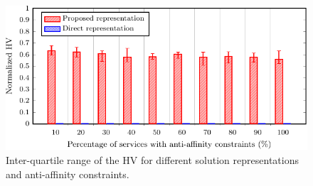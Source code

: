 \vspace{1em}
\noindent
{}

\begin{figure}[t!]
    \centering
    \includegraphics[width=\linewidth]{graphs/constraints/anti_affinity-crop}
    \caption{Inter-quartile range of the HV for different solution representations and anti-affinity constraints.}
    \label{fig:anti_affinity}
\end{figure}
